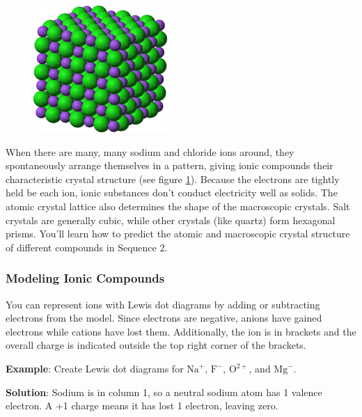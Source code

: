 \begin{figure}
\noindent\includegraphics[width=2in]{NaCl_lattice.png}
\caption{}
\label{fig:NaCl_lattice}
\end{figure}

When there are many, many sodium and chloride ions around, they spontaneously 
arrange themselves in a pattern, giving ionic compounds their characteristic 
crystal structure (see figure \ref{fig:NaCl_lattice}). Because the electrons are 
tightly held be each ion, ionic substances don't conduct electricity well as 
solids. The atomic crystal lattice also determines the shape of the macroscopic 
crystals. Salt crystals are generally cubic, while other crystals (like quartz) 
form hexagonal prisms. You'll learn how to predict the atomic and macroscopic 
crystal structure of different compounds in Sequence 2. 

\subsubsection{Modeling Ionic Compounds}
You can represent ions with Lewis dot diagrams by adding or subtracting electrons 
from the model. Since electrons are negative, anions have gained electrons while 
cations have lost them. Additionally, the ion is in brackets and the overall 
charge is indicated outside the top right corner of the brackets. 

\textbf{Example}: Create Lewis dot diagrams for $\text{Na}^{+}$, $\text{F}^{-}$, 
$\text{O}^{2+}$, and $\text{Mg}^{-}$.

\textbf{Solution}: Sodium is in column 1, so a neutral sodium atom has 1 valence 
electron. A +1 charge means it has lost 1 electron, leaving zero.

\begin{center}
\end{center}

